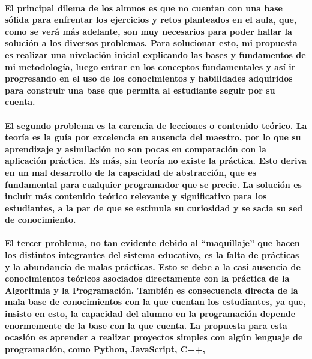 \documentclass[a4paper, 10pt]{article}
\begin{document}
    \paragraph{
        El principal dilema de los almnos es que no cuentan con una base sólida para enfrentar los ejercicios y retos planteados en el aula, 
        que, como se verá más adelante, son muy necesarios para poder hallar la solución a los diversos problemas. Para solucionar esto, 
        mi propuesta es realizar una nivelación inicial explicando las bases y fundamentos de mi metodología, luego entrar en los conceptos 
        fundamentales y así ir progresando en el uso de los conocimientos y habilidades adquiridos para construir una base que permita al 
        estudiante seguir por su cuenta.
    }
    \paragraph{
        El segundo problema es la carencia de lecciones o contenido teórico. La teoría es la guía por excelencia en ausencia del maestro, 
        por lo que su aprendizaje y asimilación no son pocas en comparación con la aplicación práctica. Es más, sin teoría no existe la 
        práctica. Esto deriva en un mal desarrollo de la capacidad de abstracción, que es fundamental para cualquier programador que se 
        precie. La solución es incluir más contenido teórico relevante y significativo para los estudiantes, a la par de que se estimula 
        su curiosidad y se sacia su sed de conocimiento.
    }
    \paragraph{
        El tercer problema, no tan evidente debido al ``maquillaje'' que hacen los distintos integrantes del sistema educativo, es la falta 
        de prácticas y la abundancia de malas prácticas. Esto se debe a la casi ausencia de conocimientos teóricos asociados directamente 
        con la práctica de la Algoritmia y la Programación. También es consecuencia directa de la mala base de conocimientos con la que 
        cuentan los estudiantes, ya que, insisto en esto, la capacidad del alumno en la programación depende enormemente de la base con la 
        que cuenta. La propuesta para esta ocasión es aprender a realizar proyectos simples con algún lenguaje de programación, como 
        Python, JavaScript, C++, 
    }
\end{document}
